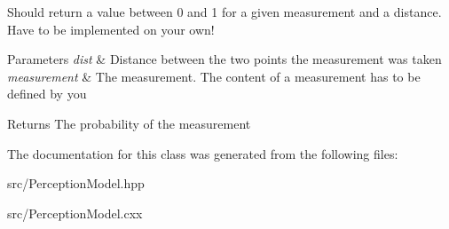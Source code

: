 Should return a value between 0 and 1 for a given measurement and a distance. Have to be implemented on your own! 


\begin{DoxyParams}{Parameters}
{\em dist} & Distance between the two points the measurement was taken \\
\hline
{\em measurement} & The measurement. The content of a measurement has to be defined by you\\
\hline
\end{DoxyParams}
\begin{DoxyReturn}{Returns}
The probability of the measurement 
\end{DoxyReturn}


The documentation for this class was generated from the following files\+:\begin{DoxyCompactItemize}
\item 
src/Perception\+Model.\+hpp\item 
src/Perception\+Model.\+cxx\end{DoxyCompactItemize}
